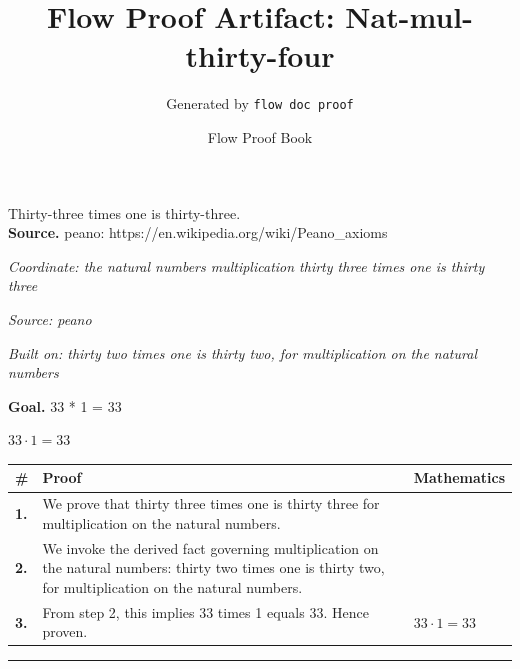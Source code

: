 \documentclass[11pt]{article}
\title{Flow Proof Artifact: Nat-mul-thirty-four}
\author{Generated by \texttt{flow doc proof}}
\date{Flow Proof Book}
\theoremstyle{definition}
\begin{document}
\maketitle
Thirty-three times one is thirty-three.\\[0.5em]
\textbf{Source.} peano: https://en.wikipedia.org/wiki/Peano\_axioms\\[0.5em]
\bigskip
{}\par
\smallskip\noindent\textit{Coordinate: the natural numbers \cdot multiplication \cdot thirty three times one is thirty three}\par
\smallskip\noindent\textit{Source: peano}\par
\smallskip\noindent\textit{Built on: thirty two times one is thirty two, for multiplication on the natural numbers}\par
\medskip
\noindent\textbf{Goal.} 33 * 1 = 33\par
\noindent$\displaystyle 33 \cdot 1 = 33$\par
\medskip
\noindent
\begin{tabular}{@{} >{\raggedright\arraybackslash}p{} >{\raggedright\arraybackslash}p{} >{\raggedleft\arraybackslash}p{} @{}}
\textbf{\#} & \textbf{Proof} & \textbf{Mathematics} \\
\midrule
\textbf{1.} & We prove that thirty three times one is thirty three for multiplication on the natural numbers. & \\[0.45em]
\textbf{2.} & We invoke the derived fact governing multiplication on the natural numbers: thirty two times one is thirty two, for multiplication on the natural numbers. & \\[0.45em]
\textbf{3.} & From step 2, this implies 33 times 1 equals 33. Hence proven. & $\displaystyle 33 \cdot 1 = 33$ \\[0.45em]
\bottomrule
\end{tabular}
\label{thm:Nat-multiplication-thirty_three_times_one_is_thirty_three}
\par\medskip\hrule
\end{document}
